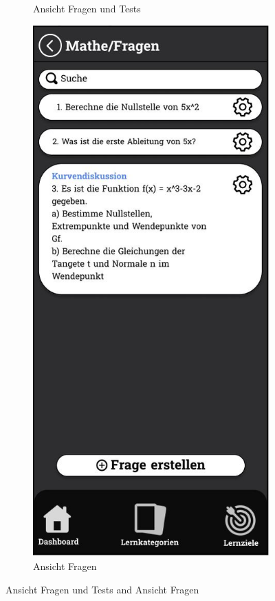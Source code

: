 \begin{figure}[htbp]
\begin{subfigure}[b]{0.45\linewidth}
          \caption{Ansicht Fragen und Tests}
          \label{fig:fragen-tests-ansicht}
        \end{subfigure}
        \hfill
        \begin{subfigure}[b]{0.45\linewidth}
          \centering
          \includegraphics[width=\linewidth]{images/Mockups/Fragen.JPG}
          \caption{Ansicht Fragen}
          \label{fig:fragen-ansicht}
        \end{subfigure}
        \caption{Ansicht Fragen und Tests and Ansicht Fragen}
        \label{fig:fragen-tests}
      \end{figure}

